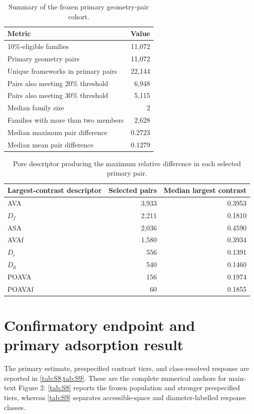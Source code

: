 \documentclass[11pt,a4paper]{article}
\begin{document}
\begin{table}[H]
\centering
\caption{Summary of the frozen primary geometry-pair cohort.}
\label{tab:S6}
\begin{tabular}{lr}
\toprule
Metric & Value \\
\midrule
10\%-eligible families & 11,072 \\
Primary geometry pairs & 11,072 \\
Unique frameworks in primary pairs & 22,144 \\
Pairs also meeting 20\% threshold & 6,948 \\
Pairs also meeting 30\% threshold & 5,115 \\
Median family size & 2 \\
Families with more than two members & 2,628 \\
Median maximum pair difference & 0.2723 \\
Median mean pair difference & 0.1279 \\
\bottomrule
\end{tabular}
\end{table}

\begin{table}[H]
\centering
\caption{Pore descriptor producing the maximum relative difference in each
selected primary pair.}
\label{tab:S7}
\begin{tabular}{lrr}
\toprule
Largest-contrast descriptor & Selected pairs & Median largest contrast \\
\midrule
AVA & 3,933 & 0.3953 \\
$D_f$ & 2,211 & 0.1810 \\
ASA & 2,036 & 0.4590 \\
AVAf & 1,580 & 0.3934 \\
$D_i$ & 556 & 0.1391 \\
$D_{\mathrm{if}}$ & 540 & 0.1460 \\
POAVA & 156 & 0.1974 \\
POAVAf & 60 & 0.1855 \\
\bottomrule
\end{tabular}
\end{table}

\section{Confirmatory endpoint and primary adsorption result}
\label{sec:primary}

The primary estimate, prespecified contrast tiers, and class-resolved response are reported in \cref{tab:S8,tab:S9}. These are the complete numerical anchors for main-text Figure 2: \cref{tab:S8} reports the frozen population and stronger prespecified tiers, whereas \cref{tab:S9} separates accessible-space and diameter-labelled response classes.
\end{document}
